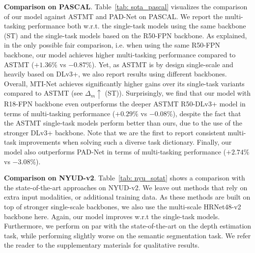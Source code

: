 \documentclass[runningheads]{llncs}
\begin{document}
\noindent\textbf{Comparison on PASCAL}.
Table~\ref{tab: sota_pascal} visualizes the comparison of our model against ASTMT and PAD-Net on PASCAL. We report the multi-tasking performance both w.r.t. the single-task models using the same backbone (ST) and the single-task models based on the R50-FPN backbone. As explained, in the only possible fair comparison, i.e. when using the same R50-FPN backbone, our model achieves higher multi-tasking performance compared to ASTMT ($+1.36\%$ vs $-0.87\%$). Yet, as ASTMT is by design single-scale and heavily based on DLv3+, we also report results using different backbones. Overall, MTI-Net achieves significantly higher gains over its single-task variants compared to ASTMT (see $\Delta_m \uparrow $ (ST)). Surprisingly, we find that our model with R18-FPN backbone even outperforms the deeper ASTMT R50-DLv3+ model in terms of multi-tasking performance ($+0.29\%$ vs $-0.08\%$), despite the fact that the ASTMT single-task models perform better than ours, due to the use of the stronger DLv3+ backbone. Note that we are the first to report consistent multi-task improvements when solving such a diverse task dictionary. Finally, our model also outperforms PAD-Net in terms of multi-tasking performance  ($+2.74 \%$ vs $-3.08\%$).

\noindent\textbf{Comparison on NYUD-v2}. 
Table~\ref{tab: nyu_sotat} shows a comparison with the state-of-the-art approaches on NYUD-v2. We leave out methods that rely on extra input modalities, or additional training data. As these methods are built on top of stronger single-scale backbones, we also use the multi-scale HRNet48-v2 backbone here. Again, our model improves w.r.t the single-task models. Furthermore, we perform on par with the state-of-the-art on the depth estimation task, while performing slightly worse on the semantic segmentation task. We refer the reader to the supplementary materials for qualitative results.
\end{document}

